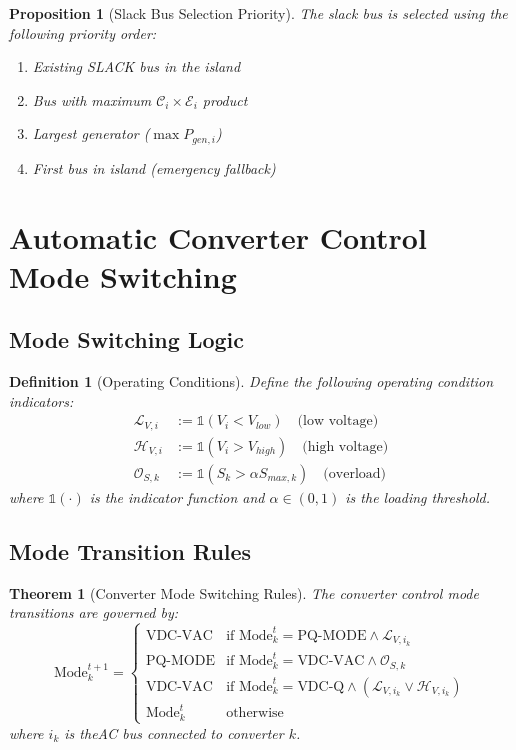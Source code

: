 \documentclass[11pt]{article}
\def\_{-}%
\newtheorem{theorem}{Theorem}
\newtheorem{proposition}{Proposition}
\newtheorem{definition}{Definition}
\begin{document}
\begin{proposition}[Slack Bus Selection Priority]
The slack bus is selected using the following priority order:
\begin{enumerate}
    \item Existing SLACK bus in the island
    \item Bus with maximum $\mathcal{C}_i \times \mathcal{E}_i$ product
    \item Largest generator ($\max P_{gen,i}$)
    \item First bus in island (emergency fallback)
\end{enumerate}
\end{proposition}

\section{Automatic Converter Control Mode Switching}

\subsection{Mode Switching Logic}

\begin{definition}[Operating Conditions]
Define the following operating condition indicators:
\begin{align}
\mathcal{L}_{V,i} &:= \mathbb{1}(V_i < V_{low}) \quad \text{(low voltage)} \\
\mathcal{H}_{V,i} &:= \mathbb{1}(V_i > V_{high}) \quad \text{(high voltage)} \\
\mathcal{O}_{S,k} &:= \mathbb{1}(S_k > \alpha S_{max,k}) \quad \text{(overload)}
\end{align}
where $\mathbb{1}(\cdot)$ is the indicator function and $\alpha \in (0,1)$ is the loading threshold.
\end{definition}

\subsection{Mode Transition Rules}

\begin{theorem}[Converter Mode Switching Rules]
The converter control mode transitions are governed by:
\begin{equation}
\text{Mode}_{k}^{t+1} = \begin{cases}
\text{VDC\_VAC} & \text{if Mode}_k^t = \text{PQ\_MODE} \land \mathcal{L}_{V,i_k} \\
\text{PQ\_MODE} & \text{if Mode}_k^t = \text{VDC\_VAC} \land \mathcal{O}_{S,k} \\
\text{VDC\_VAC} & \text{if Mode}_k^t = \text{VDC\_Q} \land (\mathcal{L}_{V,i_k} \lor \mathcal{H}_{V,i_k}) \\
\text{Mode}_k^t & \text{otherwise}
\end{cases}
\end{equation}
where $i_k$ is theAC bus connected to converter $k$.
\end{theorem}
\end{document}
